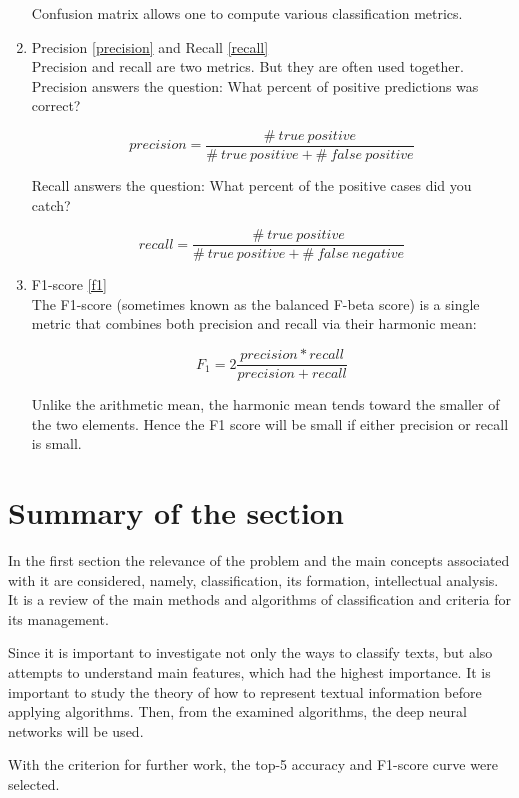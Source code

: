\begin{enumerate}
\begin{figure}[ht]
	\end{figure}
	
	Confusion matrix allows one to compute various classification metrics.
	
	\item Precision \ref{precision} and Recall \ref{recall}\\
	Precision and recall are two metrics. But they are often used together.
	Precision answers the question: What percent of positive predictions was correct?
	
	\begin{equation}
	\label{precision}
	precision = {\frac{\#\ true\ positive}{\#\ true\ positive + \#\ false\ positive}}
	\end{equation}
	
	Recall answers the question: What percent of the positive cases did you catch?
	
	\begin{equation}
	\label{recall}
	recall = {\frac{\#\ true\ positive}{\#\ true\ positive + \#\ false\ negative}}
	\end{equation}
	
	\item F1-score \ref{f1}\\
	The F1-score (sometimes known as the balanced F-beta score) is a single metric that combines both precision and recall via their harmonic mean:
	
	\begin{equation}
	\label{f1}
	F_1 = 2 {\frac{precision * recall}{precision + recall}}
	\end{equation}
	
	Unlike the arithmetic mean, the harmonic mean tends toward the smaller of the two elements. Hence the F1 score will be small if either precision or recall is small.
\end{enumerate}

\section{Summary of the section}

In the first section the relevance of the problem and the main concepts associated with it are considered, namely, classification, its formation, intellectual analysis. It is a review of the main methods and algorithms of classification and criteria for its management.

Since it is important to investigate not only the ways to classify texts, but also attempts to understand main features, which had the highest importance. It is important to study the theory of how to represent textual information before applying algorithms. Then, from the examined algorithms, the deep neural networks will be used. 

With the criterion for further work, the top-5 accuracy and F1-score curve were selected.
